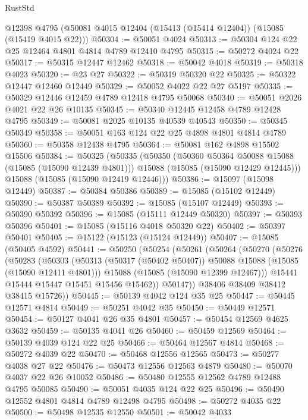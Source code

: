 \begin{lexlean}{RustStd}
\begin{coremodule}
    @12398
    @4795
    (@50081 @4015 @12404 (@15413 (@15414 @12404)) (@15085 (@15419 @4015 @22)))
@50304 := @50051 @4024
@50313 := @50304 @124 @22 @25 @12464 @4801 @4814 @4789 @12410 @4795
@50315 := @50272 @4024 @22
@50317 := @50315 @12447 @12462
@50318 := @50042 @4018
@50319 := @50318 @4023
@50320 := @23 @27
@50322 := @50319 @50320 @22
@50325 := @50322 @12447 @12460 @12449
@50329 := @50052 @4022 @22 @27 @5197
@50335 := @50329 @12446 @12459 @4789 @12418 @4795 @50068
@50340 := @50051 @2026 @4021 @22 @26 @10135
@50345 := @50340 @12445 @12458 @4789 @12428 @4795
@50349 := @50081 @2025 @10135 @40539 @40543
@50350 := @50345 @50349
@50358 := @50051 @163 @124 @22 @25 @4898 @4801 @4814 @4789
@50360 := @50358 @12438 @4795
@50364 := @50081 @162 @4898 @15502 @15506
@50384 := @50325
    (@50335
      (@50350
        (@50360 @50364 @50088 @15088 (@15085 (@15090 @12439 @4801)))
        @15088
        (@15085 (@15090 @12429 @12445)))
      @15088
      (@15085 (@15090 @12419 @12446)))
@50386 := @15097 (@15098 @12449)
@50387 := @50384 @50386
@50389 := @15085 (@15102 @12449)
@50390 := @50387 @50389
@50392 := @15085 (@15107 @12449)
@50393 := @50390 @50392
@50396 := @15085 (@15111 @12449 @50320)
@50397 := @50393 @50396
@50401 := @15085 (@15116 @4018 @50320 @22)
@50402 := @50397 @50401
@50405 := @15122 (@15123 (@15124 @12449))
@50407 := @15085 (@50405 @4592)
@50441 := @50250
    (@50254
      (@50261
        (@50264
          (@50270
            (@50276
              (@50283
                (@50303
                  (@50313 (@50317 (@50402 @50407)) @50088 @15088 (@15085 (@15090 @12411 @4801)))
                  @15088
                  (@15085 (@15090 @12399 @12467)))
                @15441
                @15444
                @15447
                @15451
                @15456
                @15462))
            @50147))
        @38406
        @38409
        @38412
        @38415
        @15726))
@50445 := @50139 @4042 @124 @35 @25
@50447 := @50445 @12571 @4814
@50449 := @50251 @4042 @35
@50450 := @50449 @12571
@50454 := @50127 @4041 @26 @35 @4801
@50457 := @50454 @12569 @4625 @3632
@50459 := @50135 @4041 @26
@50460 := @50459 @12569
@50464 := @50139 @4039 @124 @22 @25
@50466 := @50464 @12567 @4814
@50468 := @50272 @4039 @22
@50470 := @50468 @12556 @12565
@50473 := @50277 @4038 @27 @22
@50476 := @50473 @12556 @12563 @4879
@50480 := @50070 @4037 @22 @26 @10052
@50486 := @50480 @12555 @12562 @4789 @12488 @4795 @50085
@50490 := @50051 @4035 @124 @22 @25
@50496 := @50490 @12552 @4801 @4814 @4789 @12498 @4795
@50498 := @50272 @4035 @22
@50500 := @50498 @12535 @12550
@50501 := @50042 @4033

\end{coremodule}
\end{lexlean}
